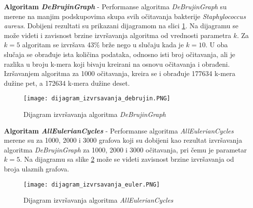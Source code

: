 \documentclass[12pt,oneside]{memoir}
\begin{document}


\textbf{Algoritam \textit{DeBrujinGraph}} - Performanse algoritma \textit{DeBrujinGraph} su merene na manjim podskupovima skupa svih očitavanja bakterije \textit{Staphylococcus aureus}. Dobijeni rezultati su prikazani dijagramom na slici \ref{fig:dijagramIzvrsavanjaDebrujin}. Na dijagramu se može videti i zavisnost brzine izvršavanja algoritma od vrednosti parametra $k$. Za $k = 5$ algoritam se izvršava 43$\%$ brže nego u slučaju kada je $k = 10$. U oba slučaja se obrađuje ista količina podataka, odnosno isti broj očitavanja, ali je razlika u broju k-mera koji bivaju kreirani na osnovu očitavanja i obrađeni. Izršavanjem algoritma za 1000 očitavanja, kreira se i obrađuje 177634 k-mera dužine pet, a 172634 k-mera dužine deset.

\begin{figure}[!ht]
  \centering
  \texttt{[image: dijagram\_izvrsavanja\_debrujin.PNG]}
  \caption{Dijagram izvršavanja algoritma \textit{DeBrujinGraph}}
  \label{fig:dijagramIzvrsavanjaDebrujin}
\end{figure}

\textbf{Algoritam \textit{AllEulerianCycles}} - Performanse algoritma \textit{AllEulerianCycles} merene su za 1000, 2000 i 3000 grafova koji su dobijeni kao rezultat izvršavanja algoritma \textit{DeBrujinGraph} za 1000, 2000 i 3000 očitavanja, pri čemu je parametar $k = 5$. Na dijagramu sa slike \ref{fig:dijagramIzvrsavanjaEuler} može se videti zavisnost brzine izvršavanja od broja ulaznih grafova.

\begin{figure}[!ht]
  \centering
  \texttt{[image: dijagram\_izvrsavanja\_euler.PNG]}
  \caption{Dijagram izvršavanja algoritma \textit{AllEulerianCycles}}
  \label{fig:dijagramIzvrsavanjaEuler}
\end{figure}
\end{document}
